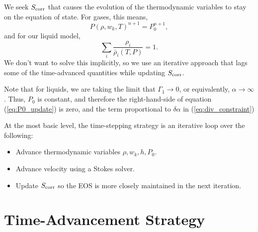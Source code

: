 \documentclass[final]{siamltex}
\begin{document}
We seek $S_{\rm corr}$ that causes the evolution of the thermodynamic variables to stay on the equation of 
state.  For gases, this means,
\begin{equation}
P(\rho,w_k,T)^{n+1} = P_0^{n+1},
\end{equation}
and for our liquid model,
\begin{equation}
\sum_i\frac{\rho_i}{\bar\rho_i(T,P)} = 1.
\end{equation}
We don't want to solve this implicitly, so we use an iterative approach that lags some
of the time-advanced quantities while updating $S_{\rm corr}$.

Note that for liquids, we are taking the limit that $\Gamma_1 \rightarrow 0$, or equivalently,
$\alpha\rightarrow\infty$.  Thus, $P_0$ is constant, and therefore the right-hand-side of equation 
(\ref{eq:P0_update}) is zero, and the term proportional to $\delta\alpha$ in 
(\ref{eq:div_constraint}) %


At the most basic level, the time-stepping strategy is an iterative loop over the following:\\
\begin{itemize}
\item Advance thermodynamic variables $\rho,w_k,h,P_0$.
\item Advance velocity using a Stokes solver.
\item Update $S_{\rm corr}$ so the EOS is more closely maintained in the next iteration.
\end{itemize}

\section{Time-Advancement Strategy}\label{Sec:Time-Advancement Strategy}
\end{document}
